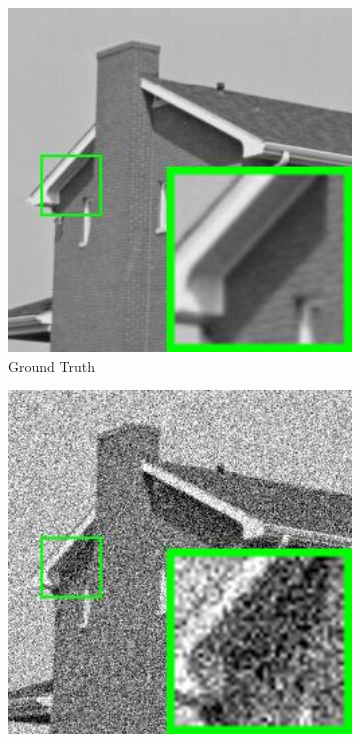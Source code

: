\begin{figure}
    \centering
    \begin{subfigure}[t]{0.24\textwidth}
        \centering
        \includegraphics[width=1\textwidth]{images/pgpd/br_house.jpg}
	   \caption{Ground Truth}
    \end{subfigure}
    \hfill
    \begin{subfigure}[t]{0.24\textwidth}
        \centering
        \includegraphics[width=1\textwidth]{images/pgpd/br_40_house.jpg}

\end{subfigure}
\end{figure}
